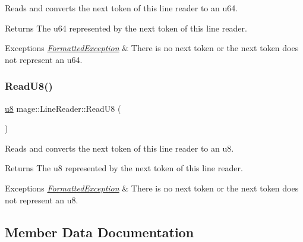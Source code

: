 Reads and converts the next token of this line reader to an {\ttfamily u64}.

\begin{DoxyReturn}{Returns}
The {\ttfamily u64} represented by the next token of this line reader. 
\end{DoxyReturn}

\begin{DoxyExceptions}{Exceptions}
{\em \hyperlink{structmage_1_1_formatted_exception}{Formatted\+Exception}} & There is no next token or the next token does not represent an {\ttfamily u64}. \\
\hline
\end{DoxyExceptions}
\hypertarget{classmage_1_1_line_reader_a8a92596b33e4909c947a1b7a425310a1}{}\label{classmage_1_1_line_reader_a8a92596b33e4909c947a1b7a425310a1} 
\subsubsection{\texorpdfstring{Read\+U8()}{ReadU8()}}
{\footnotesize\ttfamily \hyperlink{namespacemage_a5a362e2d56fc439362a80516ecae7828}{u8} mage\+::\+Line\+Reader\+::\+Read\+U8 (\begin{DoxyParamCaption}{ }\end{DoxyParamCaption})\hspace{0.3cm}{\ttfamily [protected]}}

Reads and converts the next token of this line reader to an {\ttfamily u8}.

\begin{DoxyReturn}{Returns}
The {\ttfamily u8} represented by the next token of this line reader. 
\end{DoxyReturn}

\begin{DoxyExceptions}{Exceptions}
{\em \hyperlink{structmage_1_1_formatted_exception}{Formatted\+Exception}} & There is no next token or the next token does not represent an {\ttfamily u8}. \\
\hline
\end{DoxyExceptions}


\subsection{Member Data Documentation}
\hypertarget{classmage_1_1_line_reader_a2f1cfe313dc89741386178e63a6b8b0c}{}\label{classmage_1_1_line_reader_a2f1cfe313dc89741386178e63a6b8b0c} 
